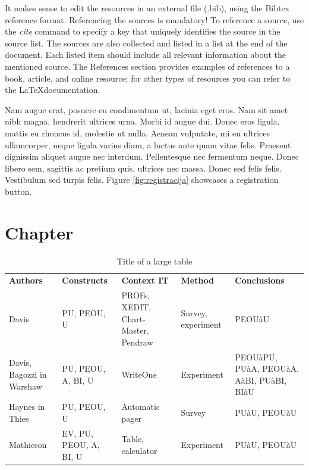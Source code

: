 \documentclass{comjnl}
\begin{document}
It makes sense to edit the resources in an external file (.bib), using the Bibtex reference format. Referencing the sources is mandatory! To reference a source, use the \textit{cite} command to specify a key that uniquely identifies the source in the source list. The sources are also collected and listed in a list at the end of the document. Each listed item should include all relevant information about the mentioned source. The References section provides examples of references to a book, article, and online resource; for other types of resources you can refer to the \LaTeX documentation.

Nam augue erat, posuere eu condimentum ut, lacinia eget eros. Nam sit amet nibh magna, hendrerit ultrices urna. Morbi id augue dui. Donec eros ligula, mattis eu rhoncus id, molestie ut nulla. Aenean vulputate, mi eu ultrices ullamcorper, neque ligula varius diam, a luctus ante quam vitae felis. Praesent dignissim aliquet augue nec interdum. Pellentesque nec fermentum neque. Donec libero sem, sagittis ac pretium quis, ultrices nec massa. Donec sed felis felis. Vestibulum sed turpis felis.
Figure \ref{fig:registracija} showcases a registration button. 


\section{Chapter} 

\begin{table} %
\captionsetup{justification=raggedright}
\caption{Title of a large table}
\label{tab:sirokatabela}
\begin{tabular}{>{\raggedright\arraybackslash}m{2.7cm}>{\raggedright\arraybackslash}m{3.3cm}>{\raggedright\arraybackslash}m{3.3cm}>{\raggedright\arraybackslash}m{3cm}>{\raggedright\arraybackslash}m{3.3cm}}
\rowcolor[HTML]{656565} 
{\color[HTML]{FFFFFF} \textbf{Authors}} & {\color[HTML]{FFFFFF} \textbf{Constructs}} & {\color[HTML]{FFFFFF} \textbf{Context IT}} & {\color[HTML]{FFFFFF} \textbf{Method}} & {\color[HTML]{FFFFFF} \textbf{Conclusions}} \\ 
Davis & PU, PEOU, U & PROFs, XEDIT, Chart-Master, Pendraw & Survey, experiment &   PEOUàU \\ \hline
Davis, Bagozzi in Warshaw & PU, PEOU, A, BI, U & WriteOne & Experiment & PEOUàPU, PUàA, PEOUàA, AàBI, PUàBI, BIàU \\ \hline
Haynes in Thies & PU, PEOU, U & Automatic pager & Survey & PUàU, PEOUàU \\ \hline
Mathieson & EV, PU, PEOU, A, BI, U & Table, calculator & Experiment & PUàU,   PEOUàU \\ \hline
\end{tabular}
\end{table}
\end{document}
